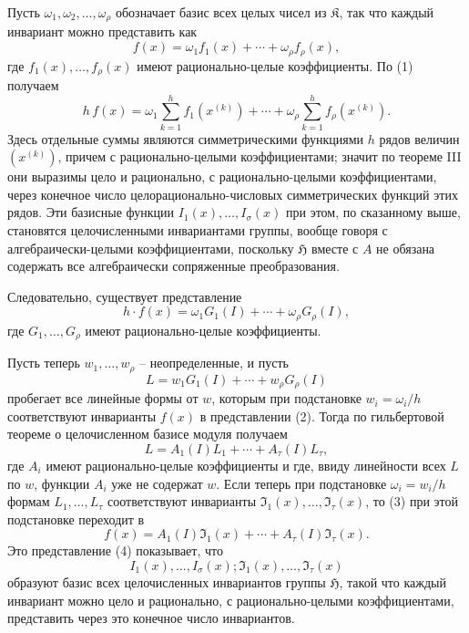 \documentclass[11pt]{article}
\providecommand{\frH}{\mathfrak H}
\providecommand{\frK}{\mathfrak K}
\begin{document}
Пусть \(\omega_1,\omega_2,\ldots,\omega_\rho\) обозначает базис всех целых чисел из \(\frK\), так что каждый инвариант можно представить как
\[
        f(x)=\omega_1 f_1(x)+\cdots+\omega_\rho f_\rho(x),
\]
где \(f_1(x),\ldots,f_\rho(x)\) имеют рационально-целые коэффициенты. По (1) получаем
\[
        h\,f(x)
        =
        \omega_1\sum_{k=1}^{h}f_1(x^{(k)})
        +\cdots+
        \omega_\rho\sum_{k=1}^{h}f_\rho(x^{(k)}).
\]
Здесь отдельные суммы являются симметрическими функциями \(h\) рядов величин \((x^{(k)})\), причем с рационально-целыми коэффициентами; значит по теореме III они выразимы цело и рационально, с рационально-целыми коэффициентами, через конечное число целорационально-числовых симметрических функций этих рядов. Эти базисные функции \(I_1(x),\ldots,I_\sigma(x)\) при этом, по сказанному выше, становятся целочисленными инвариантами группы, вообще говоря с алгебраически-целыми коэффициентами, поскольку \(\frH\) вместе с \(A\) не обязана содержать все алгебраически сопряженные преобразования.

Следовательно, существует представление
\begin{equation}
        h\cdot f(x)=\omega_1G_1(I)+\cdots+\omega_\rho G_\rho(I),
\end{equation}
где \(G_1,\ldots,G_\rho\) имеют рационально-целые коэффициенты.

Пусть теперь \(w_1,\ldots,w_\rho\) -- неопределенные, и пусть
\[
        L=w_1G_1(I)+\cdots+w_\rho G_\rho(I)
\]
пробегает все линейные формы от \(w\), которым при подстановке \(w_i=\omega_i/h\) соответствуют инварианты \(f(x)\) в представлении (2). Тогда по гильбертовой теореме о целочисленном базисе модуля получаем
\begin{equation}
        L=A_1(I)L_1+\cdots+A_\tau(I)L_\tau,
\end{equation}
где \(A_i\) имеют рационально-целые коэффициенты и где, ввиду линейности всех \(L\) по \(w\), функции \(A_i\) уже не содержат \(w\). Если теперь при подстановке \(\omega_i=w_i/h\) формам \(L_1,\ldots,L_\tau\) соответствуют инварианты \(\mathfrak I_1(x),\ldots,\mathfrak I_\tau(x)\), то (3) при этой подстановке переходит в
\begin{equation}
        f(x)=A_1(I)\mathfrak I_1(x)+\cdots+A_\tau(I)\mathfrak I_\tau(x).
\end{equation}
Это представление (4) показывает, что
\[
        I_1(x),\ldots,I_\sigma(x);\mathfrak I_1(x),\ldots,\mathfrak I_\tau(x)
\]
образуют базис всех целочисленных инвариантов группы \(\frH\), такой что каждый инвариант можно цело и рационально, с рационально-целыми коэффициентами, представить через это конечное число инвариантов.
\end{document}
